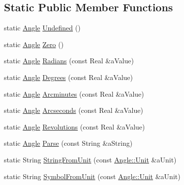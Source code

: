 \subsection*{Static Public Member Functions}
\begin{DoxyCompactItemize}
\item 
static \hyperlink{classlibrary_1_1math_1_1geom_1_1_angle}{Angle} \hyperlink{classlibrary_1_1math_1_1geom_1_1_angle_a1d86aa71d0296bd34c7b0dae9eff612f}{Undefined} ()
\item 
static \hyperlink{classlibrary_1_1math_1_1geom_1_1_angle}{Angle} \hyperlink{classlibrary_1_1math_1_1geom_1_1_angle_a5c3ee9a927e2b27e4feaa9afbd08384d}{Zero} ()
\item 
static \hyperlink{classlibrary_1_1math_1_1geom_1_1_angle}{Angle} \hyperlink{classlibrary_1_1math_1_1geom_1_1_angle_a9f4a8ad6bfe63060c86c0f1fb2753cf7}{Radians} (const Real \&a\+Value)
\item 
static \hyperlink{classlibrary_1_1math_1_1geom_1_1_angle}{Angle} \hyperlink{classlibrary_1_1math_1_1geom_1_1_angle_a64aa53e8420aeb6f671d86c65c370bc8}{Degrees} (const Real \&a\+Value)
\item 
static \hyperlink{classlibrary_1_1math_1_1geom_1_1_angle}{Angle} \hyperlink{classlibrary_1_1math_1_1geom_1_1_angle_aac8021abaab10168d6815bfd05fddca5}{Arcminutes} (const Real \&a\+Value)
\item 
static \hyperlink{classlibrary_1_1math_1_1geom_1_1_angle}{Angle} \hyperlink{classlibrary_1_1math_1_1geom_1_1_angle_a5f287a6f2f46d81370e4c207c783422f}{Arcseconds} (const Real \&a\+Value)
\item 
static \hyperlink{classlibrary_1_1math_1_1geom_1_1_angle}{Angle} \hyperlink{classlibrary_1_1math_1_1geom_1_1_angle_a49035704c48951dcf6e6b570b3d849de}{Revolutions} (const Real \&a\+Value)
\item 
static \hyperlink{classlibrary_1_1math_1_1geom_1_1_angle}{Angle} \hyperlink{classlibrary_1_1math_1_1geom_1_1_angle_a8dad2390bb728ceb7762351171059098}{Parse} (const String \&a\+String)
\item 
static String \hyperlink{classlibrary_1_1math_1_1geom_1_1_angle_a5f3e35152926a4478d427dbc39ade11e}{String\+From\+Unit} (const \hyperlink{classlibrary_1_1math_1_1geom_1_1_angle_ab593c4dafbb9a5c29fdbe114eaae8eae}{Angle\+::\+Unit} \&a\+Unit)
\item 
static String \hyperlink{classlibrary_1_1math_1_1geom_1_1_angle_a06d1a87ebfc87b334d9fb6d408422fb9}{Symbol\+From\+Unit} (const \hyperlink{classlibrary_1_1math_1_1geom_1_1_angle_ab593c4dafbb9a5c29fdbe114eaae8eae}{Angle\+::\+Unit} \&a\+Unit)
\end{DoxyCompactItemize}
